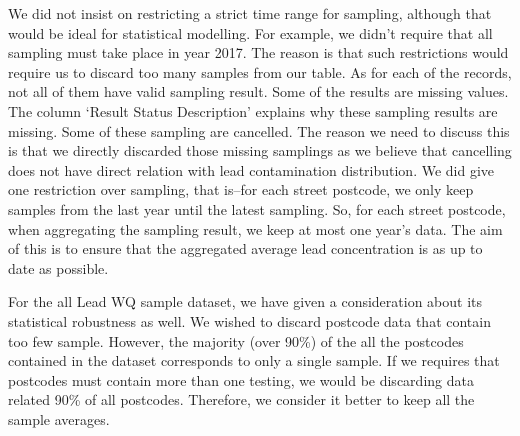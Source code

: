 \documentclass[11pt,twoside]{article}
\numberwithin{Theorem}{section}
\numberwithin{Definition}{section}
\numberwithin{Lemma}{section}
\numberwithin{Algorithm}{section}
\numberwithin{equation}{section}
\begin{document}
We did not insist on restricting a strict time range for sampling, although that would be ideal for statistical modelling. For example, we didn't require that all sampling must take place in year 2017. The reason is that such restrictions would require us to discard too many samples from our table.
As for each of the records, not all of them have valid sampling result. Some of the results are missing values. The column `Result Status Description' explains why these sampling results are missing. Some of these sampling are cancelled. The reason we need to discuss this is that we directly discarded those missing samplings as we believe that cancelling does not have direct relation with lead contamination distribution. We did give one restriction over sampling, that is--for each street postcode, we only keep samples from the last year until the latest sampling. So, for each street postcode, when aggregating the sampling result, we keep at most one year's data. The aim of this is to ensure that the aggregated average lead concentration is as up to date as possible.

For the all Lead WQ sample dataset, we have given a consideration about its statistical robustness as well. We wished to discard postcode data that contain too few sample. However, the majority (over 90\%) of the all the postcodes contained in the dataset corresponds to only a single sample. If we requires that postcodes must contain more than one testing, we would be discarding data related 90\% of all postcodes. Therefore, we consider it better to keep all the sample averages.


\clearpage



\clearpage
\end{document}
